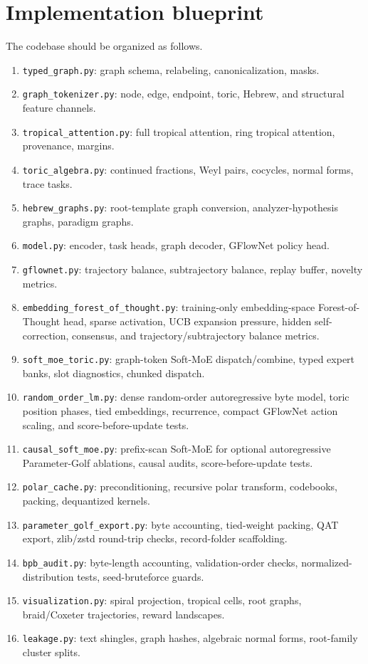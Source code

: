 \documentclass[11pt]{article}
\theoremstyle{definition}
\theoremstyle{plain}
\theoremstyle{remark}
\numberwithin{equation}{section}
\begin{document}
\section{Implementation blueprint}

The codebase should be organized as follows.
\begin{enumerate}[leftmargin=2em]
  \item \texttt{typed\_graph.py}: graph schema, relabeling, canonicalization, masks.
  \item \texttt{graph\_tokenizer.py}: node, edge, endpoint, toric, Hebrew, and structural feature channels.
  \item \texttt{tropical\_attention.py}: full tropical attention, ring tropical attention, provenance, margins.
  \item \texttt{toric\_algebra.py}: continued fractions, Weyl pairs, cocycles, normal forms, trace tasks.
  \item \texttt{hebrew\_graphs.py}: root-template graph conversion, analyzer-hypothesis graphs, paradigm graphs.
  \item \texttt{model.py}: encoder, task heads, graph decoder, GFlowNet policy head.
  \item \texttt{gflownet.py}: trajectory balance, subtrajectory balance, replay buffer, novelty metrics.
  \item \texttt{embedding\_forest\_of\_thought.py}: training-only embedding-space Forest-of-Thought head, sparse activation, UCB expansion pressure, hidden self-correction, consensus, and trajectory/subtrajectory balance metrics.
  \item \texttt{soft\_moe\_toric.py}: graph-token Soft-MoE dispatch/combine, typed expert banks, slot diagnostics, chunked dispatch.
  \item \texttt{random\_order\_lm.py}: dense random-order autoregressive byte model, toric position phases, tied embeddings, recurrence, compact GFlowNet action scaling, and score-before-update tests.
  \item \texttt{causal\_soft\_moe.py}: prefix-scan Soft-MoE for optional autoregressive Parameter-Golf ablations, causal audits, score-before-update tests.
  \item \texttt{polar\_cache.py}: preconditioning, recursive polar transform, codebooks, packing, dequantized kernels.
  \item \texttt{parameter\_golf\_export.py}: byte accounting, tied-weight packing, QAT export, zlib/zstd round-trip checks, record-folder scaffolding.
  \item \texttt{bpb\_audit.py}: byte-length accounting, validation-order checks, normalized-distribution tests, seed-bruteforce guards.
  \item \texttt{visualization.py}: spiral projection, tropical cells, root graphs, braid/Coxeter trajectories, reward landscapes.
  \item \texttt{leakage.py}: text shingles, graph hashes, algebraic normal forms, root-family cluster splits.
\end{enumerate}
\end{document}
